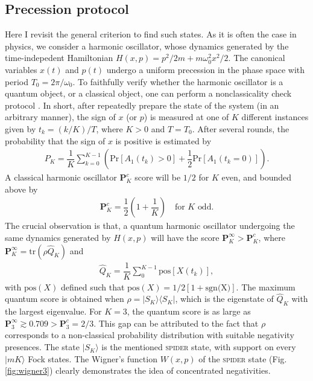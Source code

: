 \documentclass[%
 reprint,
superscriptaddress,
 amsmath,amssymb,
 aps,13pt
]{revtex4-2}
\begin{document}
\subsection{Precession protocol}
Here I revisit the general criterion to find such states. As it is often the case in physics, we consider a harmonic oscillator, whose dynamics generated by the time-indepedent Hamiltonian $H(x,p)=p^2/2m+m\omega_0^2x^2/2$. The canonical variables $x(t)$ and $p(t)$ undergo a uniform precession in the phase space with period $T_0=2\pi/\omega_0$. To faithfully verify whether the harmonic oscillator is a quantum object, or a classical object, one can perform a nonclassicality check protocol \cite{lin22}. In short, after repeatedly prepare the state of the system (in an arbitrary manner), the sign of $x$ (or $p$) is measured at one of $K$ different instances given by $t_k=(k/K)/T$, where $K>0$ and $T=T_0$. After several rounds, the probability that the sign of $x$ is positive is estimated by
\begin{align}
    P_K = \dfrac{1}{K}\sum_{k=0}^{K-1}\left(\text{Pr}[A_1(t_k)>0]+\dfrac{1}{2}\text{Pr}[A_1(t_k=0)]\right).
\end{align}
A classical harmonic oscillator $\mathbf{P}^c_K$ score will be $1/2$ for $K$ even, and bounded above by
\begin{align}
    \mathbf{P}^c_K=\dfrac{1}{2}\left(1+\dfrac{1}{K}\right)\quad\text{for $K$ odd}.
\end{align}
The crucial observation is that, a quantum harmonic oscillator undergoing the same dynamics generated by $H(x,p)$ will have the score $\mathbf{P}^\infty_K>\mathbf{P}^c_K$, where $\mathbf{P}^\infty_K=\text{tr}(\rho \hat{Q}_K)$ and
\begin{align}
    \hat{Q}_K = \dfrac{1}{K}\sum_0^{K-1}\text{pos}[X(t_k)],
\end{align}
with $\text{pos}(X)$ defined such that $\text{pos}(X)=1/2[1+\text{sgn(X)}]$. The maximum quantum score is obtained when $\rho=|S_K\rangle\langle S_K|$, which is the eigenstate of $\hat{Q}_K$ with the largest eigenvalue. For $K=3$, the quantum score is as large as $\mathbf{P}^\infty_3 \gtrsim 0.709 > \mathbf{P}_3^c=2/3$. This gap can be attributed to the fact that $\rho$ corresponds to a non-classical probability distribution with suitable negativity presences. The state $|S_K\rangle$ is the mentioned \textsc{spider} state, with support on every $|mK\rangle$ Fock states. The Wigner's function $W(x,p)$ of the \textsc{spider} state (Fig. \ref{fig:wigner3}) clearly demonstrates the idea of concentrated negativities.
\end{document}
